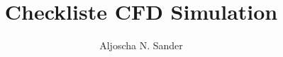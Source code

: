 \documentclass[12pt,captions=tableheading]{scrartcl}
\title{Checkliste CFD Simulation}
\author{Aljoscha N. Sander}
\begin{document}
\maketitle
\tableofcontents

\begin{abstract}
\end{abstract}

\section{}
\end{document}
